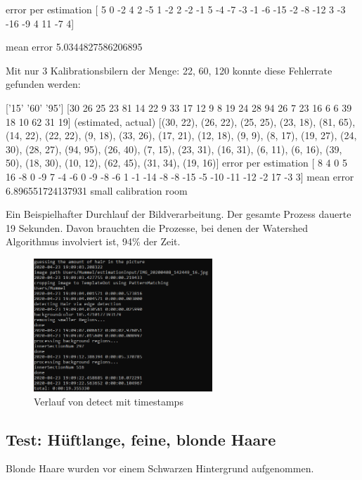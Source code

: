 \documentclass[german,a4paper, 12pt]{llncs}
\begin{document}
error per estimation [  5   0  -2   4   2  -5   1  -2   2  -2  -1   5  -4  -7  -3  -1  -6 -15
-2  -8 -12   3  -3 -16  -9   4  11  -7   4]

mean error 5.0344827586206895


Mit nur 3 Kalibrationsbilern der Menge: 22, 60, 120 konnte diese Fehlerrate gefunden werden:

['15' '60' '95']
[30 26 25 23 81 14 22  9 33 17 12  9  8 19 24 28 94 26  7 23 16  6  6 39
18 10 62 31 19]
(estimated, actual)
[(30, 22), (26, 22), (25, 25), (23, 18), (81, 65), (14, 22), (22, 22), (9, 18), (33, 26), (17, 21), (12, 18), (9, 9), (8, 17), (19, 27), (24, 30), (28, 27), (94, 95), (26, 40), (7, 15), (23, 31), (16, 31), (6, 11), (6, 16), (39, 50), (18, 30), (10, 12), (62, 45), (31, 34), (19, 16)]
error per estimation [  8   4   0   5  16  -8   0  -9   7  -4  -6   0  -9  -8  -6   1  -1 -14
-8  -8 -15  -5 -10 -11 -12  -2  17  -3   3]
mean error 6.896551724137931
small calibration room

Ein Beispielhafter Durchlauf der Bildverarbeitung. Der gesamte Prozess dauerte 19 Sekunden. Davon brauchten die Prozesse, bei denen der Watershed Algorithmus involviert ist, 94\% der Zeit. 

\begin{figure}[H]
	\centering
	\includegraphics[width=0.6\textwidth]{fig64/time.png}
	\caption[]{Verlauf von detect mit timestamps}
	\label{img:time}
\end{figure} 

\subsection{Test: Hüftlange, feine, blonde Haare}

Blonde Haare wurden vor einem Schwarzen Hintergrund aufgenommen. 
\end{document}
